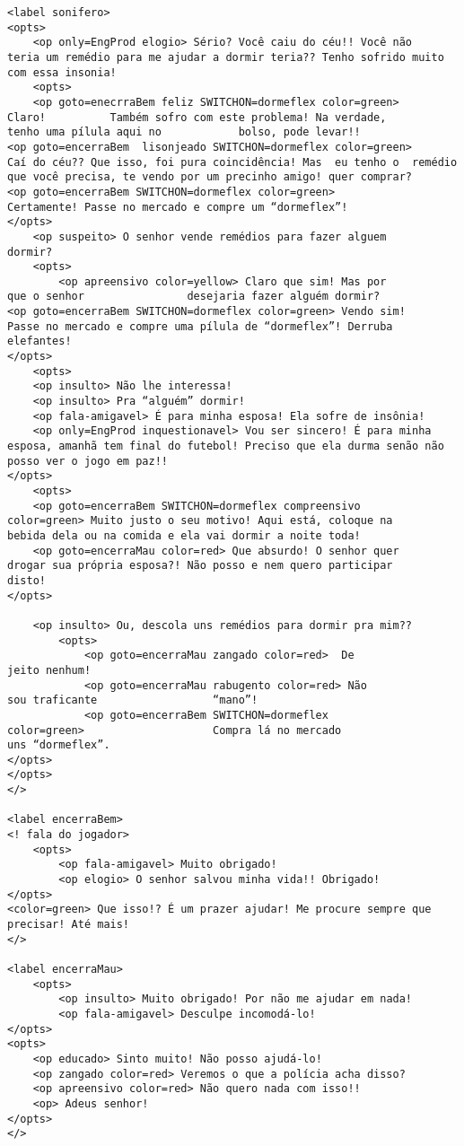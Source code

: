 {\begin{verbatim}
<label sonifero>
<opts>
	<op only=EngProd elogio> Sério? Você caiu do céu!! Você não
teria um remédio para me ajudar a dormir teria?? Tenho sofrido muito
com essa insonia!
	<opts>
	<op goto=enecrraBem feliz SWITCHON=dormeflex color=green>
Claro! 			Também sofro com este problema! Na verdade,
tenho uma pílula aqui no 			bolso, pode levar!!
<op goto=encerraBem  lisonjeado SWITCHON=dormeflex color=green>
Caí do céu?? Que isso, foi pura coincidência! Mas  eu tenho o  remédio
que você precisa, te vendo por um precinho amigo! quer comprar?
<op goto=encerraBem SWITCHON=dormeflex color=green>
Certamente! Passe no mercado e compre um “dormeflex”!
</opts>
	<op suspeito> O senhor vende remédios para fazer alguem
dormir?
	<opts>
		<op apreensivo color=yellow> Claro que sim! Mas por
que o senhor 				desejaria fazer alguém dormir?
<op goto=encerraBem SWITCHON=dormeflex color=green> Vendo sim!
Passe no mercado e compre uma pílula de “dormeflex”! Derruba
elefantes!
</opts>
	<opts>
	<op insulto> Não lhe interessa!
	<op insulto> Pra “alguém” dormir!
	<op fala-amigavel> É para minha esposa! Ela sofre de insônia!
	<op only=EngProd inquestionavel> Vou ser sincero! É para minha
esposa, amanhã tem final do futebol! Preciso que ela durma senão não
posso ver o jogo em paz!!
</opts>
	<opts>
	<op goto=encerraBem SWITCHON=dormeflex compreensivo
color=green> Muito justo o seu motivo! Aqui está, coloque na
bebida dela ou na comida e ela vai dormir a noite toda!
	<op goto=encerraMau color=red> Que absurdo! O senhor quer
drogar sua própria esposa?! Não posso e nem quero participar
disto!
</opts>
	
	<op insulto> Ou, descola uns remédios para dormir pra mim??
		<opts>
			<op goto=encerraMau zangado color=red>  De
jeito nenhum!
			<op goto=encerraMau rabugento color=red> Não
sou traficante 					“mano”!
			<op goto=encerraBem SWITCHON=dormeflex
color=green> 					Compra lá no mercado
uns “dormeflex”.
</opts>
</opts>
</>

<label encerraBem>
<! fala do jogador>
	<opts>
		<op fala-amigavel> Muito obrigado!
		<op elogio> O senhor salvou minha vida!! Obrigado!
</opts>
<color=green> Que isso!? É um prazer ajudar! Me procure sempre que
precisar! Até mais!
</>

<label encerraMau>
	<opts>
		<op insulto> Muito obrigado! Por não me ajudar em nada!
		<op fala-amigavel> Desculpe incomodá-lo!
</opts>
<opts>
	<op educado> Sinto muito! Não posso ajudá-lo!
	<op zangado color=red> Veremos o que a polícia acha disso?
	<op apreensivo color=red> Não quero nada com isso!!
	<op> Adeus senhor!
</opts>
</>
\end{verbatim}
}
